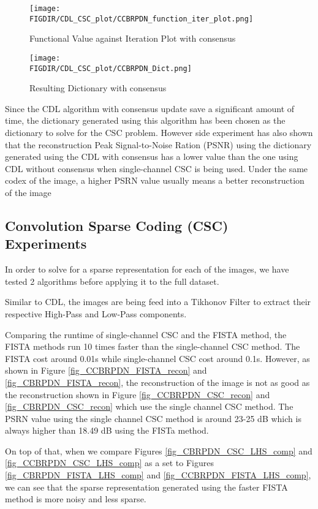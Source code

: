 \begin{figure}[ht]
\centering
\texttt{[image: \\FIGDIR/CDL\_CSC\_plot/CCBRPDN\_function\_iter\_plot.png]}
\caption{Functional Value against Iteration Plot with consensus}
\label{fig_CCBRPDN_function_iter_plot}
\end{figure}

\begin{figure}[ht]
\centering
\texttt{[image: \\FIGDIR/CDL\_CSC\_plot/CCBRPDN\_Dict.png]}
\caption{Resulting Dictionary with consensus}
\label{fig_CCBRPDN_Dict}
\end{figure}

Since the CDL algorithm with consensus update save a significant amount of 
time, the dictionary generated using this algorithm has been chosen
as the dictionary to solve for the CSC problem. However side experiment has
also shown that the reconstruction Peak Signal-to-Noise Ration (PSNR) using 
the dictionary generated using the CDL with consensus has a lower value than 
the one using CDL without consensus when single-channel CSC is being used.
Under the same codex of the image, a higher PSRN value usually means
a better reconstruction of the image

\subsection{Convolution Sparse Coding (CSC) Experiments}
In order to solve for a sparse representation for each of the images, we 
have tested 2 algorithms before applying it to the full dataset.

Similar to CDL, the images are being feed into a Tikhonov Filter to extract
their respective High-Pass and Low-Pass components.

Comparing the runtime of single-channel CSC and the FISTA method, the 
FISTA methods run 10 times faster than the single-channel CSC method. The 
FISTA cost around 0.01s while single-channel CSC cost around 0.1s. However,
as shown in Figure \ref{fig_CCBRPDN_FISTA_recon} and \ref{fig_CBRPDN_FISTA_recon},
the reconstruction of the image is not as good as the reconstruction shown in
Figure \ref{fig_CCBRPDN_CSC_recon} and \ref{fig_CBRPDN_CSC_recon} which use the single 
channel CSC method. The PSRN value using the single channel CSC method is around 23-25 dB
which is always higher than 18.49 dB using the FISTa method.

On top of that, when we compare 
Figures \ref{fig_CBRPDN_CSC_LHS_comp} and \ref{fig_CCBRPDN_CSC_LHS_comp} as a set to
Figures \ref{fig_CBRPDN_FISTA_LHS_comp} and \ref{fig_CCBRPDN_FISTA_LHS_comp}, we can see that 
the sparse representation generated using the faster FISTA method is more noisy
and less sparse.

